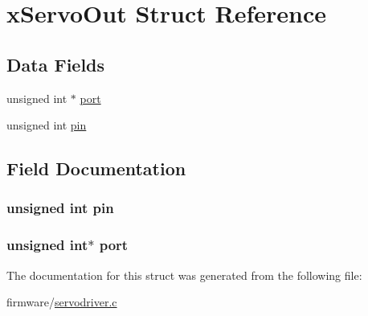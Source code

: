 \hypertarget{structx_servo_out}{\section{x\-Servo\-Out Struct Reference}
\label{structx_servo_out}
}
\subsection*{Data Fields}
\begin{DoxyCompactItemize}
\item 
unsigned int $\ast$ \hyperlink{structx_servo_out_a09e3e6606ab4307f379bd6978956f369}{port}
\item 
unsigned int \hyperlink{structx_servo_out_a867fe4e0366cbc13a194e166b96b0216}{pin}
\end{DoxyCompactItemize}


\subsection{Field Documentation}
\hypertarget{structx_servo_out_a867fe4e0366cbc13a194e166b96b0216}{
\subsubsection[{pin}]{\setlength{\rightskip}{0pt plus 5cm}unsigned int pin}}\label{structx_servo_out_a867fe4e0366cbc13a194e166b96b0216}
\hypertarget{structx_servo_out_a09e3e6606ab4307f379bd6978956f369}{
\subsubsection[{port}]{\setlength{\rightskip}{0pt plus 5cm}unsigned int$\ast$ port}}\label{structx_servo_out_a09e3e6606ab4307f379bd6978956f369}


The documentation for this struct was generated from the following file\-:\begin{DoxyCompactItemize}
\item 
firmware/\hyperlink{servodriver_8c}{servodriver.\-c}\end{DoxyCompactItemize}
